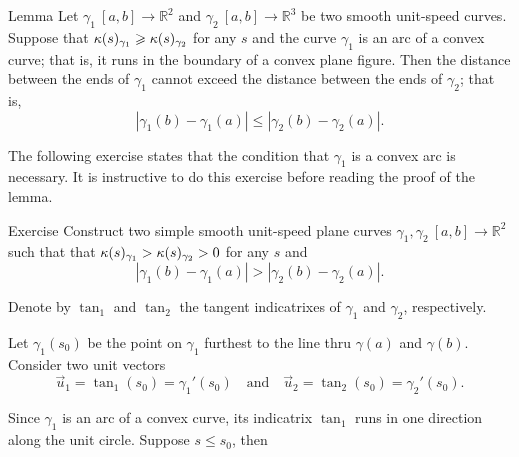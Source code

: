 \begin{thm}{Lemma}\label{lem:bow}
Let $\gamma_1\:[a,b]\to\mathbb{R}^2$ and $\gamma_2\:[a,b] \to\mathbb{R}^3$ be two smooth unit-speed curves.
Suppose that $\kappa(s)_{\gamma_1}\geqslant\kappa(s)_{\gamma_2}$ for any $s$ 
and the curve
$\gamma_1$ is an arc of a convex curve; that is, it runs in the boundary of a convex plane figure.
Then the distance between the ends of $\gamma_1$ cannot exceed the  distance between the ends of $\gamma_2$; that is,
\[|\gamma_1(b)-\gamma_1(a)|\le |\gamma_2(b)-\gamma_2(a)|.\]

\end{thm}

The following exercise states that the condition that $\gamma_1$ is a convex arc is necessary.
It is instructive to do this exercise before reading the proof of the lemma.

{\sloppy 

\begin{thm}{Exercise}\label{ex:anti-bow}
Construct two simple smooth unit-speed plane curves $\gamma_1,\gamma_2\:[a,b]\to\mathbb{R}^2$ such that 
that $\kappa(s)_{\gamma_1}>\kappa(s)_{\gamma_2}>0$ for any $s$ and
\[|\gamma_1(b)-\gamma_1(a)|> |\gamma_2(b)-\gamma_2(a)|.\]
\end{thm}

}

Denote by $\tan_1$ and $\tan_2$ the tangent indicatrixes of $\gamma_1$ and $\gamma_2$, respectively.

Let $\gamma_1(s_0)$ be the point on $\gamma_1$ furthest to the line 
thru $\gamma(a)$ and $\gamma(b)$.
Consider two unit vectors 
\[\vec u_1=\tan_1(s_0)=\gamma_1'(s_0)
\quad\text{and}\quad
\vec u_2=\tan_2(s_0)=\gamma_2'(s_0).\]

Since $\gamma_1$ is an arc of a convex curve, its indicatrix $\tan_1$ runs in one direction along the unit circle.
Suppose $s\le s_0$, then 

